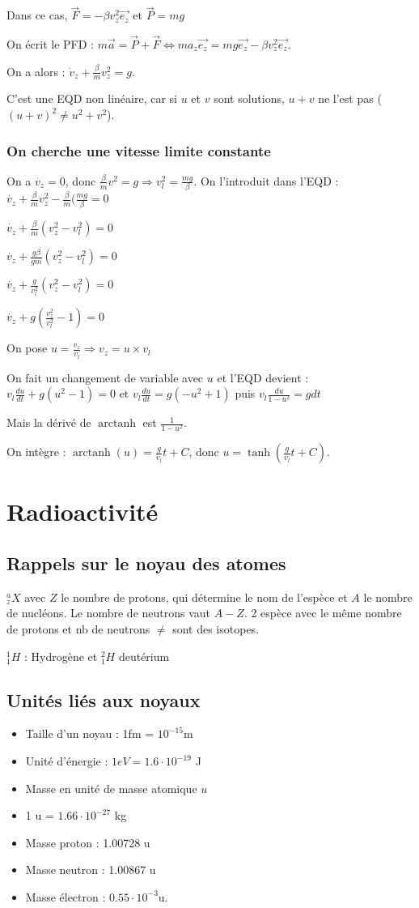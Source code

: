 \documentclass[french]{yLectureNote}
\renewcommand{\vec}{\overrightarrow}
\DeclareMathOperator\arctanh{arctanh}
\begin{document}
Dans ce cas, $\vec{F} = - \beta v_z^2 \vec{e_z}$ et $\vec{P} = mg$

On écrit le PFD : $m\vec{a} = \vec{P}+\vec{F} \iff ma_z\vec{e_z} = mg\vec{e_z}-\beta v^2_z\vec{e_z}$.

On a alors : $\dot{v}_z + \frac{\beta}{m} v^2_z = g$.

C'est une EQD non linéaire, car si $u$ et $v$ sont solutions, $u+v$ ne l'est pas ($(u+v)^2 \neq u^2+v^2$).

\subsubsection{On cherche une vitesse limite constante}
On a $\dot{v_z} = 0$, donc $\frac{\beta}{m}v^2 = g \Rightarrow v_l^2 = \frac{mg}{\beta}$. On l'introduit dans l'EQD : $\dot{v_z} + \frac{\beta}{m}v_z^2 - \frac{\beta}{m}(\frac{mg}{\beta} = 0$

$\dot{v_z} + \frac{\beta}{m}(v_z^2-v_l^2) = 0$

$\dot{v_z} + \frac{g\beta}{gm}(v_z^2-v_l^2) = 0$

$\dot{v_z} + \frac{g}{v_l^2}(v_z^2-v_l^2) = 0$

$\dot{v_z} + g(\frac{v_z^2}{v_l^2}-1) = 0$

On pose $u=\frac{v_z}{v_l} \Rightarrow v_z = u\times v_l$

On fait un changement de variable avec $u$ et l'EQD devient : $v_l\frac{du}{dt} + g(u^2-1) = 0$ et $v_l\frac{du}{dt} = g(-u^2+1) $ puis $v_l\frac{du}{1-u^2} = gdt $

Mais la dérivé de $\arctanh$ est $\frac{1}{1-u^2}$.

On intègre : $\arctanh(u) = \frac{g}{v_l}t + C$, donc $u=\tanh(\frac{g}{v_l}t + C)$.
\section{Radioactivité}
\subsection{Rappels sur le noyau des atomes}
$_z^aX$ avec $Z$ le nombre de protons, qui détermine le nom de l'espèce et $A$ le nombre de nucléons. Le nombre de neutrons vaut $A-Z$. 2 espèce avec le m\^eme nombre de protons et nb de neutrons $\neq$ sont des isotopes.

$_1^1H$ : Hydrogène et $^2_1H$ deutérium
\subsection{Unités liés aux noyaux}
\begin{itemize}
 \item Taille d'un noyau : 1fm = $10^{-15}$m
\item Unité d'énergie : $1eV = 1.6\cdot 10^{-19}$ J
\item Masse en unité de masse atomique $u$
\item 1 u = $1.66\cdot 10^{-27}$ kg
\item Masse proton : 1.00728 u
\item Masse neutron : 1.00867 u
\item Masse électron : $0.55\cdot10^{-3}$u.
\end{itemize}
\end{document}
